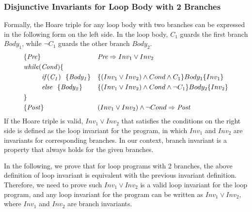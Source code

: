 \subsubsection{Disjunctive Invariants for Loop Body with 2 Branches}
Formally, the Hoare triple for any loop body with two branches can be expressed in the following form on the left side.
In the loop body, $\mathit{C_1}$ guards the first branch $\mathit{Body_1}$, while $\mathit{\neg C_1}$ guards the other branch $\mathit{Body_2}$.
\begin{align}
&\{\mathit{Pre}\} && \emph{Pre} \Rightarrow \emph{$Inv_1$} \vee \emph{$Inv_2$} \label{ext:inv:pre}\\
&\mathit{while} (\mathit{Cond}) \{ && \\
&~~~~~~~~\mathit{if} (\mathit{C_1}) ~~\{ \mathit{Body_1} \} && \{(\emph{$Inv_1$} \vee \emph{$Inv_2$}) \wedge Cond \wedge C_1\} Body_1 \{\emph{$Inv_1$}\} \label{ext:inv:loop:b1}\\
&~~~~~~~~\mathit{else} ~~\{ \mathit{Body_2} \} && \{(\emph{$Inv_1$} \vee \emph{$Inv_2$}) \wedge Cond \wedge \neg C_1\} Body_2 \{\emph{$Inv_2$}\} \label{ext:inv:loop:b2}\\
&\} && \\
&\{\mathit{Post}\} && (\emph{$Inv_1$} \vee \emph{$Inv_2$}) \wedge \neg Cond \Rightarrow \emph{Post} \label{ext:inv:post}
\end{align}
If the Hoare triple is valid, $Inv_1 \vee Inv_2$ that satisfies the conditions on the right side is defined as the loop invariant for the program,
in which $Inv_1$ and $Inv_2$ are invariants for corresponding branches.
In our context, branch invariant is a property that always holds for the given branches.


In the following, we prove that for loop programs with 2 branches,
the above definition of loop invariant is equivalent with the previous invariant definition.
Therefore, we need to prove such $Inv_1 \vee Inv_2$ is a valid loop invariant for the loop program,
and any loop invariant for the program can be written as $Inv_1 \vee Inv_2$, where $Inv_1$ and $Inv_2$ are branch invariants.

